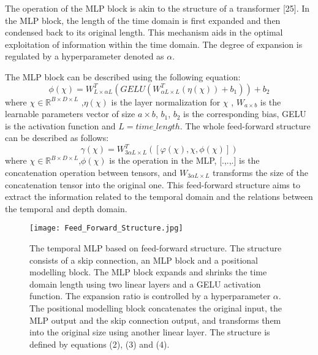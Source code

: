 \documentclass[runningheads]{llncs}
\begin{document}
The operation of the MLP block is akin to the structure of a transformer [25]. In the MLP block, the length of the time domain is first expanded and then condensed back to its original length. This mechanism aids in the optimal exploitation of information within the time domain. The degree of expansion is regulated by a hyperparameter denoted as $\alpha$.

 The MLP block can be described using the following equation:
\begin{equation}\label{eq2}
\phi(\chi)=W_{L\times \alpha L}^{T}(GELU(W_{\alpha L \times L}^{T}(\eta(\chi))+b_{1}))+b_{2}
\end{equation}
where $\chi\in\mathbb{R}^{B\times D \times L} $ ,$\eta(\chi)$   is the layer normalization for $\chi$ , $W_{a\times b}$ is the learnable parameters vector of size $a\times b$, $b_{1}$, $b_{2}$ is the corresponding bias, GELU is the activation function and $L=time\_length$.
The whole feed-forward structure can be described as follows:
\begin{equation}\label{eq3}
\gamma(\chi)=W_{3\alpha L \times L}^{T}([\varphi(\chi),\chi,\phi(\chi)])
\end{equation}
where $\chi\in\mathbb{R}^{B\times D \times L} $,$\phi(\chi)$ is the operation in the MLP, [.,.,.] is the concatenation operation between tensors, and $W_{3\alpha L \times L}$ transforms the size of the concatenation tensor into the original one. This feed-forward structure aims to extract the information related to the temporal domain and the relations between the temporal and depth domain.

\begin{figure}
\centering
\texttt{[image: Feed\_Forward\_Structure.jpg]}
\caption{The temporal MLP based on feed-forward structure. The structure consists of a skip connection, an MLP block and a positional modelling block. The MLP block expands and shrinks the time domain length using two linear layers and a GELU activation function. The expansion ratio is controlled by a hyperparameter $\alpha$. The positional modelling block concatenates the original input, the MLP output and the skip connection output, and transforms them into the original size using another linear layer. The structure is defined by equations (2), (3) and (4). } \label{fig2}
\end{figure}
\end{document}
